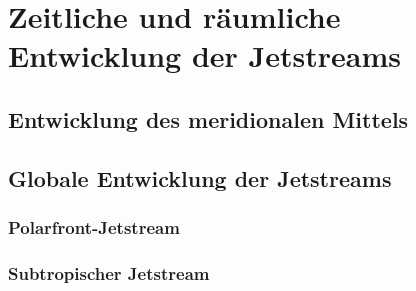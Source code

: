 \chapter[Zeitliche und räumliche Entwicklung]{Zeitliche und räumliche Entwicklung der Jetstreams}
\label{ch:klimatologie}

\section{Entwicklung des meridionalen Mittels}
\blindtext

\section{Globale Entwicklung der Jetstreams}
\blindtext

\subsection{Polarfront-Jetstream}
\blindtext

\subsection{Subtropischer Jetstream}
\blindtext
